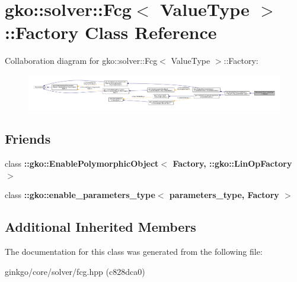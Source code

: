 \hypertarget{classgko_1_1solver_1_1Fcg_1_1Factory}{}\section{gko\+:\+:solver\+:\+:Fcg$<$ Value\+Type $>$\+:\+:Factory Class Reference}
\label{classgko_1_1solver_1_1Fcg_1_1Factory}


Collaboration diagram for gko\+:\+:solver\+:\+:Fcg$<$ Value\+Type $>$\+:\+:Factory\+:
\nopagebreak
\begin{figure}[H]
\begin{center}
\leavevmode
\includegraphics[width=350pt]{classgko_1_1solver_1_1Fcg_1_1Factory__coll__graph}
\end{center}
\end{figure}
\subsection*{Friends}
\begin{DoxyCompactItemize}
\item 
\mbox{\label{classgko_1_1solver_1_1Fcg_1_1Factory_a27e9bbc94a1c1c59f40833153eda8f78}} 
class {\bfseries \+::gko\+::\+Enable\+Polymorphic\+Object$<$ Factory, \+::gko\+::\+Lin\+Op\+Factory $>$}
\item 
\mbox{\label{classgko_1_1solver_1_1Fcg_1_1Factory_a0d176cbd42d6214e11aee8c30ca256fc}} 
class {\bfseries \+::gko\+::enable\+\_\+parameters\+\_\+type$<$ parameters\+\_\+type, Factory $>$}
\end{DoxyCompactItemize}
\subsection*{Additional Inherited Members}


The documentation for this class was generated from the following file\+:\begin{DoxyCompactItemize}
\item 
ginkgo/core/solver/fcg.\+hpp (c828dca0)\end{DoxyCompactItemize}
